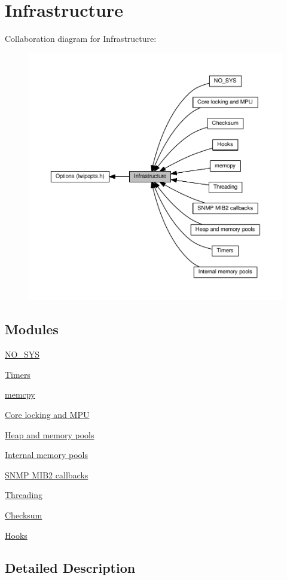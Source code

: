 \hypertarget{group__lwip__opts__infrastructure}{}\section{Infrastructure}
\label{group__lwip__opts__infrastructure}
Collaboration diagram for Infrastructure\+:
\nopagebreak
\begin{figure}[H]
\begin{center}
\leavevmode
\includegraphics[width=350pt]{group__lwip__opts__infrastructure}
\end{center}
\end{figure}
\subsection*{Modules}
\begin{DoxyCompactItemize}
\item 
\hyperlink{group__lwip__opts__nosys}{N\+O\+\_\+\+S\+YS}
\item 
\hyperlink{group__lwip__opts__timers}{Timers}
\item 
\hyperlink{group__lwip__opts__memcpy}{memcpy}
\item 
\hyperlink{group__lwip__opts__lock}{Core locking and M\+PU}
\item 
\hyperlink{group__lwip__opts__mem}{Heap and memory pools}
\item 
\hyperlink{group__lwip__opts__memp}{Internal memory pools}
\item 
\hyperlink{group__lwip__opts__mib2}{S\+N\+M\+P M\+I\+B2 callbacks}
\item 
\hyperlink{group__lwip__opts__thread}{Threading}
\item 
\hyperlink{group__lwip__opts__checksum}{Checksum}
\item 
\hyperlink{group__lwip__opts__hooks}{Hooks}
\end{DoxyCompactItemize}


\subsection{Detailed Description}
